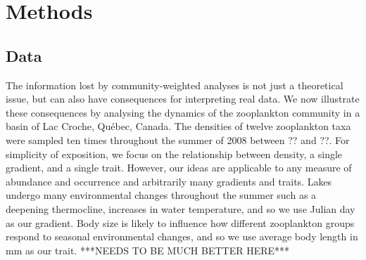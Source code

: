 \documentclass[12pt]{ecology}
\begin{document}

\section{Methods}

\subsection{Data}

The information lost by community-weighted analyses is not just a theoretical issue, but can also have consequences for interpreting real data.  We now illustrate these consequences by analysing the dynamics of the zooplankton community in a basin of Lac Croche, Qu\'{e}bec, Canada.  The densities of twelve zooplankton taxa were sampled ten times throughout the summer of 2008 between ?? and ??.  For simplicity of exposition, we focus on the relationship between density, a single gradient, and a single trait.  However, our ideas are applicable to any measure of abundance and occurrence and arbitrarily many gradients and traits.  Lakes undergo many environmental changes throughout the summer such as a deepening thermocline, increases in water temperature, and so we use Julian day as our gradient.  Body size is likely to influence how different zooplankton groups respond to seasonal environmental changes, and so we use average body length in mm as our trait.  ***NEEDS TO BE MUCH BETTER HERE***
\end{document}
